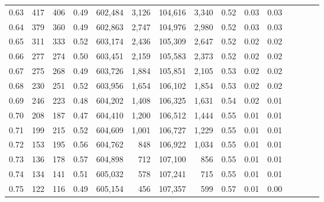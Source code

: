 \begin{tabular}{rrrcrrrrrrrrrrr}
0.63 &     417 &    406 &                                       0.49 &  602,484 &    3,126 &  104,616 &    3,340 &  0.52 &  0.03 &                         0.03 \\
0.64 &     379 &    360 &                                       0.49 &  602,863 &    2,747 &  104,976 &    2,980 &  0.52 &  0.03 &                         0.03 \\
0.65 &     311 &    333 &                                       0.52 &  603,174 &    2,436 &  105,309 &    2,647 &  0.52 &  0.02 &                         0.02 \\
0.66 &     277 &    274 &                                       0.50 &  603,451 &    2,159 &  105,583 &    2,373 &  0.52 &  0.02 &                         0.02 \\
0.67 &     275 &    268 &                                       0.49 &  603,726 &    1,884 &  105,851 &    2,105 &  0.53 &  0.02 &                         0.02 \\
0.68 &     230 &    251 &                                       0.52 &  603,956 &    1,654 &  106,102 &    1,854 &  0.53 &  0.02 &                         0.02 \\
0.69 &     246 &    223 &                                       0.48 &  604,202 &    1,408 &  106,325 &    1,631 &  0.54 &  0.02 &                         0.01 \\
0.70 &     208 &    187 &                                       0.47 &  604,410 &    1,200 &  106,512 &    1,444 &  0.55 &  0.01 &                         0.01 \\
0.71 &     199 &    215 &                                       0.52 &  604,609 &    1,001 &  106,727 &    1,229 &  0.55 &  0.01 &                         0.01 \\
0.72 &     153 &    195 &                                       0.56 &  604,762 &      848 &  106,922 &    1,034 &  0.55 &  0.01 &                         0.01 \\
0.73 &     136 &    178 &                                       0.57 &  604,898 &      712 &  107,100 &      856 &  0.55 &  0.01 &                         0.01 \\
0.74 &     134 &    141 &                                       0.51 &  605,032 &      578 &  107,241 &      715 &  0.55 &  0.01 &                         0.01 \\
0.75 &     122 &    116 &                                       0.49 &  605,154 &      456 &  107,357 &      599 &  0.57 &  0.01 &                         0.00 \\

\end{tabular}
